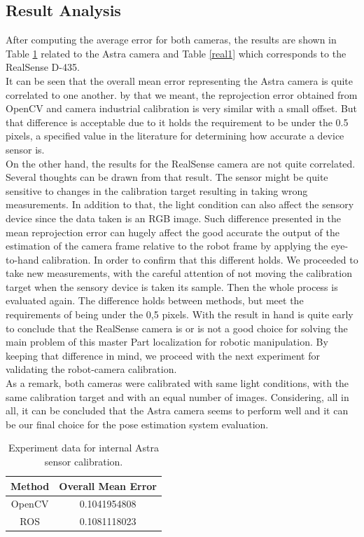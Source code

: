 \subsection{Result Analysis}
After computing the average error for both cameras, the results are shown in Table \ref{astra1} related to the Astra camera and Table \ref{real1} which corresponds to the RealSense D-435.\\
 It can be seen that the overall mean error representing the Astra camera is quite correlated to one another. by that we meant, the reprojection error obtained from OpenCV and camera \textunderscore industrial calibration is very similar with a small offset. But that difference is acceptable due to it holds the requirement to be under the 0.5 pixels, a specified value in the literature for determining how accurate a device sensor is. \\
On the other hand, the results for the RealSense camera are not quite correlated. Several thoughts can be drawn from that result. The sensor might be quite sensitive to changes in the calibration target resulting in taking wrong measurements. In addition to that, the light condition can also affect the sensory device since the data taken is an RGB image. Such difference presented in the mean reprojection error can hugely affect the good accurate the output of the estimation of the camera frame relative to the robot frame by applying the eye-to-hand calibration. In order to confirm that this different holds. We proceeded to take new measurements, with the careful attention of not moving the calibration target when the sensory device is taken its sample. Then the whole process is evaluated again. The difference holds between methods, but meet the requirements of being under the 0,5 pixels. With the result in hand is quite early to conclude that the RealSense camera is or is not a good choice for solving the main problem of this master Part localization for robotic manipulation. By keeping that difference in mind, we proceed with the next experiment for validating the robot-camera calibration.  \\
As a remark, both cameras were calibrated with same light conditions, with the same calibration target and with an equal number of images. Considering, all in all, it can be concluded that the Astra camera seems to perform well and it can be our final choice for the pose estimation system evaluation. 

\begin{table}[ht]
\renewcommand{\arraystretch}{1.3}
\caption{Experiment data for internal Astra sensor calibration.}
\label{astra1}
\centering
\begin{tabular}{|c||c|}
\hline
Method & Overall Mean Error\\
\hline
OpenCV &  0.1041954808\\
\hline
ROS &  0.1081118023\\
\hline
\hline
\end{tabular}
\end{table}

